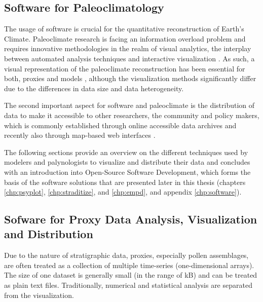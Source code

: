 \begin{refsection}

\section{Software for Paleoclimatology} \label{sec:intro-software}

The usage of software is crucial for the quantitative reconstruction of Earth's Climate. Paleoclimate research is facing an information overload problem and requires innovative methodologies in the realm of visual analytics, the interplay between automated analysis techniques and interactive visualization \citep{KeimAndrienkoFeketeEtAl2008, Nocke2014}. As such, a visual representation of the paleoclimate reconstruction has been essential for both, proxies \citep{Nichols1967, Bradley1985, Grimm1988} and models \citep{Phillips1956, RautenhausBoettingerSiemenEtAl2018, NockeSterzelBoettingerEtAl2008, Nocke2014, BoettingerRoeber2019}, although the visualization methods significantly differ due to the differences in data size and data heterogeneity.

The second important aspect for software and paleoclimate is the distribution of data to make it accessible to other researchers, the community and policy makers, which is commonly established through online accessible data archives and recently also through map-based web interfaces \citep{WilliamsGrimmBloisEtAl2018, BollietBrockmannMassonDelmotteEtAl2016}.

The following sections provide an overview on the different techniques used by modelers and palynologists to visualize and distribute their data and concludes with an introduction into Open-Source Software Development, which forms the basis of the software solutions that are presented later in this thesis (chapters \ref{chp:psyplot}, \ref{chp:straditize}, and \ref{chp:empd}, and appendix \ref{chp:software}).

\subsection{Sofware for Proxy Data Analysis, Visualization and Distribution} \label{sec:intro-software-data}

Due to the nature of stratigraphic data, proxies, especially pollen assemblages, are often treated as a collection of multiple time-series (one-dimensional arrays). The size of one dataset is generally small (in the range of kB) and can be treated as plain text files. Traditionally, numerical and statistical analysis are separated from the visualization.


\end{refsection}

